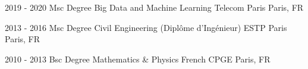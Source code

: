 

\begin{cveducations}

  \cveducation
    {2019 - 2020} %
    {Msc Degree} %
    {Big Data and Machine Learning} %
    {Telecom Paris} %
    {Paris, FR} %

  \cveducation
  {2013 - 2016} %
  {Msc Degree}
  {Civil Engineering (Dipl\^ome d'Ing\'enieur)} %
  {ESTP Paris} %
  {Paris, FR} %

\cveducation
{2010 - 2013} %
{Bsc Degree}
{Mathematics \& Physics} %
{French CPGE} %
{Paris, FR} %

\end{cveducations}


